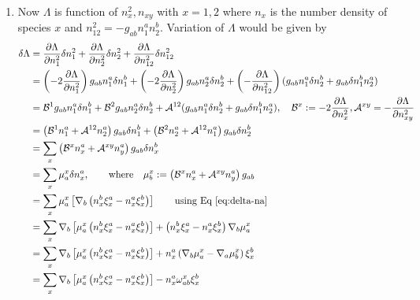 \documentclass[10pt]{article}
\begin{document}
\begin{enumerate}
\item Now $\Lambda$ is function of $n_x^2, n_{xy}$ with $x={1,2}$ where $n_x$ is the number density of species $x$ and $n^2_{12} = - g_{ab}n^a_1 n^b_2$. Variation of $\Lambda$ would be given by
  \begin{align}
    \label{eq:variation-lambda-two-fluid}
    \delta \Lambda
    &  = \frac{\partial \Lambda}{\partial n_1^2}\delta n_1^2 + \frac{\partial \Lambda}{\partial n_2^2}\delta n_2^2 + \frac{\partial \Lambda}{\partial n_{12}^2}\delta n_{12}^2\\
    & = \left(-2 \frac{\partial \Lambda}{\partial n_1^2}\right)g_{ab}n_1^a\delta n_1^b
      + \left(-2 \frac{\partial \Lambda}{\partial n_2^2}\right)g_{ab}n_2^a\delta n_2^b
      + \left(-\frac{\partial \Lambda}{\partial n_{12}^2}\right)(g_{ab}n_1^a\delta n_2^b + g_{ab}\delta n_1^b n_2^a)\\
    & = \mathcal{B}^1g_{ab}n_1^a \delta n_1^b + \mathcal{B}^2g_{ab}n_2^a \delta n_2^b
      + \mathcal{A}^{12}(g_{ab}n_1^a\delta n_2^b + g_{ab}\delta n_1^b n_2^a),\quad \mathcal{B}^x := -2 \frac{\partial\Lambda}{\partial n_x^2},\mathcal{A}^{xy} = -\frac{\partial\Lambda}{\partial n_{xy}^2}\\
    & = \left(\mathcal{B}^1 n^a_1 + \mathcal{A}^{12}n_2^a\right)g_{ab}\delta n^b_1
      + \left(\mathcal{B}^2n_2^a + \mathcal{A}^{12}n_1^a\right)g_{ab}\delta n_2^b\\
    & = \sum_{x} \left(\mathcal{B}^x n^a_x + \mathcal{A}^{xy}n_y^a\right)g_{ab}\delta n^b_x\\
    & = \sum_{x} \mu_a^x \delta n_x^a,\qquad \textrm{where}\quad \mu_b^x:= \left(\mathcal{B}^x n^a_x + \mathcal{A}^{xy}n_y^a\right)g_{ab}
    \label{eq:conjugate-momentum-two-fluid}\\
    & = \sum_{x} \mu^x_a \left[\nabla_b\left(n_x^b \xi^a_x - n^a_x \xi^b_x\right)\right]\qquad \textrm{using Eq \eqref{eq:delta-na}}\\
    & = \sum_{x} \nabla_b\left[\mu^x_a\left(n_x^b \xi^a_x - n^a_x \xi^b_x\right)\right] + \left(n_x^b \xi^a_x - n^a_x \xi^b_x\right) \nabla_b\mu^x_a \\
    & = \sum_{x} \nabla_b\left[\mu^x_a\left(n_x^b \xi^a_x - n^a_x \xi^b_x\right)\right] + n^a_x \left(\nabla_b \mu^x_a - \nabla_a \mu^x_b\right)\xi^b_x\\
    & = \sum_{x} \nabla_b\left[\mu^x_a\left(n_x^b \xi^a_x - n^a_x \xi^b_x\right)\right] - n_x^a \omega^x_{ab} \xi^b_x
  \end{align}


\end{enumerate}
\end{document}
